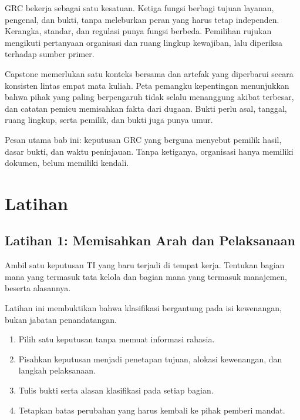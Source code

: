 GRC bekerja sebagai satu kesatuan. Ketiga fungsi berbagi tujuan layanan, pengenal, dan bukti,
tanpa meleburkan peran yang harus tetap independen. Kerangka, standar, dan regulasi punya fungsi
berbeda. Pemilihan rujukan mengikuti pertanyaan organisasi dan ruang lingkup kewajiban, lalu
diperiksa terhadap sumber primer.

Capstone memerlukan satu konteks bersama dan artefak yang diperbarui secara konsisten lintas
empat mata kuliah. Peta pemangku kepentingan menunjukkan bahwa pihak yang paling berpengaruh
tidak selalu menanggung akibat terbesar, dan catatan pemicu memisahkan fakta dari dugaan. Bukti
perlu asal, tanggal, ruang lingkup, serta pemilik, dan bukti juga punya umur.

Pesan utama bab ini: keputusan GRC yang berguna menyebut pemilik hasil, dasar bukti, dan waktu
peninjauan. Tanpa ketiganya, organisasi hanya memiliki dokumen, belum memiliki kendali.

\section{Latihan}

\subsection*{Latihan 1: Memisahkan Arah dan Pelaksanaan}

Ambil satu keputusan TI yang baru terjadi di tempat kerja. Tentukan bagian mana yang
termasuk tata kelola dan bagian mana yang termasuk manajemen, beserta alasannya.

Latihan ini membuktikan bahwa klasifikasi bergantung pada isi kewenangan, bukan jabatan
penandatangan.
\begin{enumerate}
  \item Pilih satu keputusan tanpa memuat informasi rahasia.
  \item Pisahkan keputusan menjadi penetapan tujuan, alokasi kewenangan, dan langkah
  pelaksanaan.
  \item Tulis bukti serta alasan klasifikasi pada setiap bagian.
  \item Tetapkan batas perubahan yang harus kembali ke pihak pemberi mandat.
\end{enumerate}

